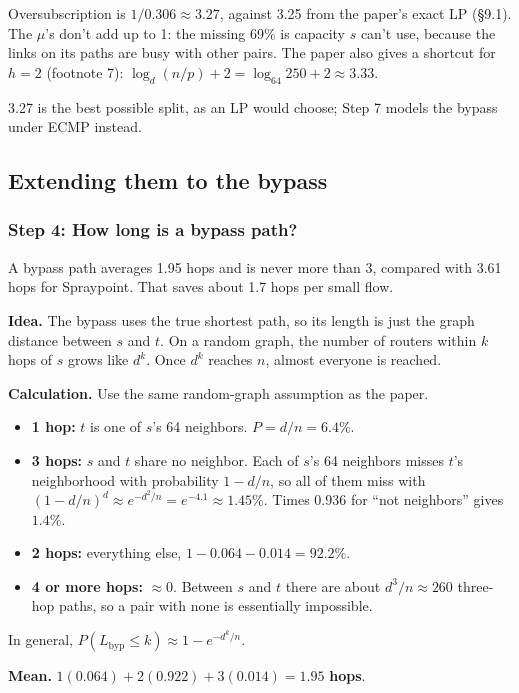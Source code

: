 Oversubscription is $1 / 0.306 \approx \mathbf{3.27}$, against 3.25 from the paper's exact LP (§9.1). The $\mu$'s don't add up to 1: the missing 69\% is capacity $s$ can't use, because the links on its paths are busy with other pairs. The paper also gives a shortcut for $h = 2$ (footnote 7): $\log_d(n/p) + 2 = \log_{64} 250 + 2 \approx 3.33$.

3.27 is the best possible split, as an LP would choose; Step 7 models the bypass under ECMP instead.

\subsection{Extending them to the bypass}

\subsubsection{Step 4: How long is a bypass path?}

A bypass path averages 1.95 hops and is never more than 3, compared with 3.61 hops for Spraypoint. That saves about 1.7 hops per small flow.

\textbf{Idea.} The bypass uses the true shortest path, so its length is just the graph distance between $s$ and $t$. On a random graph, the number of routers within $k$ hops of $s$ grows like $d^k$. Once $d^k$ reaches $n$, almost everyone is reached.

\textbf{Calculation.} Use the same random-graph assumption as the paper.
\begin{itemize}
  \item \textbf{1 hop:} $t$ is one of $s$'s 64 neighbors. $P = d/n = 6.4\%$.
  \item \textbf{3 hops:} $s$ and $t$ share no neighbor. Each of $s$'s 64 neighbors misses $t$'s neighborhood with probability $1 - d/n$, so all of them miss with $(1 - d/n)^d \approx e^{-d^2/n} = e^{-4.1} \approx 1.45\%$. Times 0.936 for ``not neighbors'' gives $1.4\%$.
  \item \textbf{2 hops:} everything else, $1 - 0.064 - 0.014 = 92.2\%$.
  \item \textbf{4 or more hops:} $\approx 0$. Between $s$ and $t$ there are about $d^3/n \approx 260$ three-hop paths, so a pair with none is essentially impossible.
\end{itemize}

In general, $P(L_{\text{byp}} \le k) \approx 1 - e^{-d^k / n}$.

\textbf{Mean.} $1(0.064) + 2(0.922) + 3(0.014) = \mathbf{1.95}$ \textbf{hops}.

